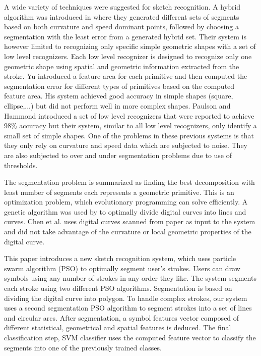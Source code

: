 \documentclass{article}
\begin{document}
A wide variety of techniques were suggested for sketch recognition.  A hybrid algorithm was introduced in \cite{earlyprocess} where they generated different sets of segments based on both curvature and speed dominant points, followed by choosing a segmentation with the least error from a generated hybrid set. Their system is however limited to recognizing only specific simple geometric shapes with a set of low level recognizers. Each low level recognizer is designed to recognize only one geometric shape using spatial and geometric information extracted from the stroke.  Yu \cite{meanshift10} introduced a feature area for each primitive and then computed the segmentation error for different types of primitives based on the computed feature area. His system achieved good accuracy in simple shapes (square, ellipse,...) but did not perform well in more complex shapes. Paulson and Hammond\cite{Paleosketch08} introduced a set of low level recognizers that were reported to achieve 98\%  accuracy but their system, similar to all low level recognizers, only identify a small set of simple shapes. One of the problems in these previous systems is that they only rely on curvature and speed data which are subjected to noise. They are also subjected to over and under segmentation problems due to use of thresholds. 

The segmentation problem is summarized as finding the best decomposition with least number of segments each represents a geometric primitive. This is an optimization problem, which evolutionary programming can solve efficiently. A genetic algorithm was used by \cite{CruveDivisionSwarm} to optimally divide digital curves into lines and curves. Chen et al.\cite{CruveDivisionSwarm} uses digital curves scanned from paper as input to the system and did not take advantage of the curvature or local geometric properties of the digital curve.

This paper introduces a new sketch recognition system, which uses particle swarm algorithm (PSO) to optimally segment user's strokes. Users can draw symbols using any number of strokes in any order they like. The system segments each stroke using two different PSO algorithms. Segmentation is based on dividing the digital curve into polygon\cite{PolygonApproximationPSO}. To handle complex strokes, our system uses a second segmentation PSO algorithm to segment strokes into a set of lines and circular arcs. After segmentation, a symbol features vector composed of different statistical, geometrical and spatial features is deduced. The final classification step, SVM classifier uses the computed feature vector to classify the segments into one of the previously trained classes. 
\end{document}
